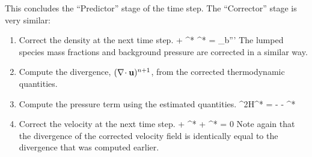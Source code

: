 \noindent
This concludes the ``Predictor'' stage of the time step.  The ``Corrector'' stage is very similar:

\begin{enumerate}

\item Correct the density at the next time step.
\be
{} +  \nabla\!\cdot \rho^* \bu^* = \dm_b'''
\ee
The lumped species mass fractions and background pressure are corrected in a similar way.

\item Compute the divergence, $(\nabla\!\cdot {\bf u})^{n+1}$, from the corrected thermodynamic quantities.

\item Compute the pressure term using the estimated quantities.
\be
\label{eqn_corrector_poisson2}
\nabla^2{\cal H}^* = - 
   - \nabla\!\cdot {}^*
\ee

\item Correct the velocity at the next time step.
\be
{} + ^* + ^*  = 0
\ee
Note again that the divergence of the corrected velocity field is identically equal to the divergence that was computed earlier.


\end{enumerate}
